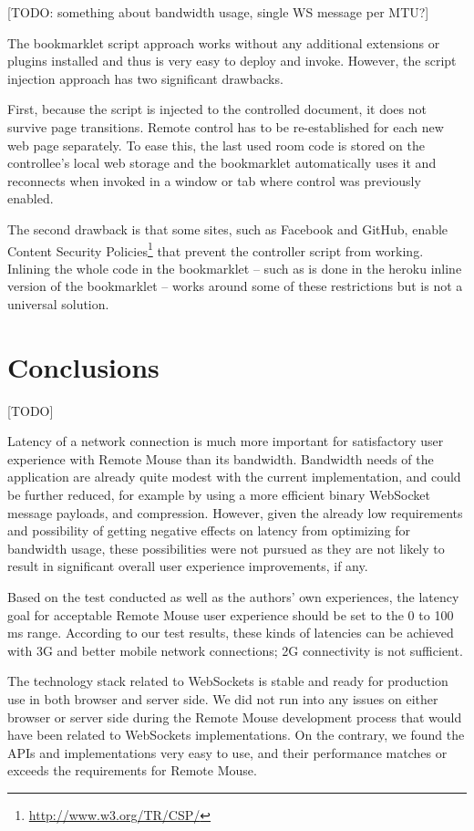 \documentclass[a4paper,english,twocolumn]{article}
\begin{document}
[TODO: something about bandwidth usage, single WS message per MTU?]

The bookmarklet script approach works without any additional
extensions or plugins installed and thus is very easy to deploy and
invoke. However, the script injection approach has two significant
drawbacks.

First, because the script is injected to the controlled document, it
does not survive page transitions. Remote control has to be
re-established for each new web page separately. To ease this, the
last used room code is stored on the controllee's local web storage
and the bookmarklet automatically uses it and reconnects when invoked
in a window or tab where control was previously enabled.

The second drawback is that some sites, such as Facebook and GitHub,
enable Content Security
Policies\footnote{\url{http://www.w3.org/TR/CSP/}} that prevent the
controller script from working. Inlining the whole code in the
bookmarklet -- such as is done in the heroku inline version of the
bookmarklet -- works around some of these restrictions but is not a
universal solution.

\section{Conclusions}

[TODO]

Latency of a network connection is much more important for
satisfactory user experience with Remote Mouse than its
bandwidth. Bandwidth needs of the application are already quite modest
with the current implementation, and could be further reduced, for
example by using a more efficient binary WebSocket message payloads,
and compression. However, given the already low requirements and
possibility of getting negative effects on latency from optimizing for
bandwidth usage, these possibilities were not pursued as they are not
likely to result in significant overall user experience improvements,
if any.

Based on the test conducted as well as the authors' own experiences,
the latency goal for acceptable Remote Mouse user experience should be
set to the 0 to 100 ms range. According to our test results, these
kinds of latencies can be achieved with 3G and better mobile network
connections; 2G connectivity is not sufficient.

The technology stack related to WebSockets is stable and ready for
production use in both browser and server side. We did not run into
any issues on either browser or server side during the Remote Mouse
development process that would have been related to WebSockets
implementations. On the contrary, we found the APIs and
implementations very easy to use, and their performance matches or
exceeds the requirements for Remote Mouse.
\end{document}

